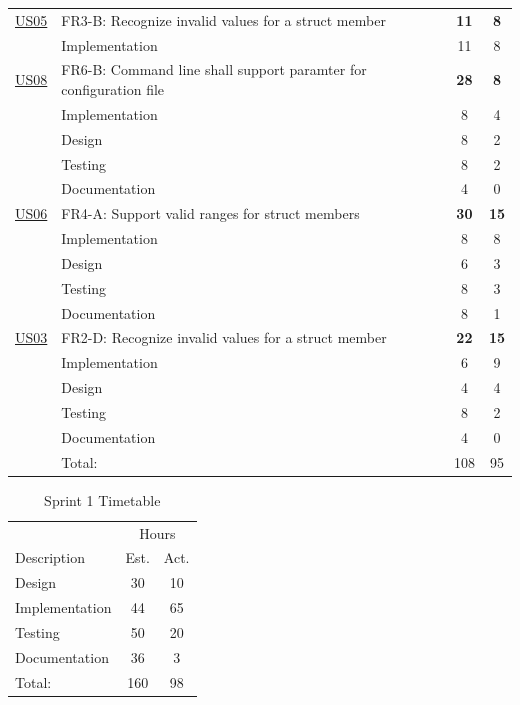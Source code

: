 \begin{table}[!htb]
\begin{tabularx}{\textwidth}{l X c c}
	\addlinespace
	\hyperref[tab:req:stories1]{US05} & FR3-B: Recognize invalid values for a \gls{struct} \gls{member} & \textbf{11} & \textbf{8} \\
	& Implementation & 11 & 8 \\
	\addlinespace
	\hyperref[tab:req:stories2]{US08} & FR6-B: Command line shall support paramter for configuration file & \textbf{28} & \textbf{8} \\
	& Implementation & 8 & 4 \\
	& Design & 8 & 2 \\
	& Testing & 8 & 2 \\
	& Documentation & 4 & 0 \\
	\addlinespace
	\hyperref[tab:req:stories2]{US06} & FR4-A: Support valid ranges for \gls{struct} \glspl{member} & \textbf{30} & \textbf{15} \\
	& Implementation & 8 & 8 \\
	& Design & 6 & 3 \\
	& Testing & 8 & 3 \\
	& Documentation & 8 & 1 \\
	\addlinespace
	\hyperref[tab:req:stories1]{US03} & FR2-D: Recognize invalid values for a \gls{struct} \gls{member} & \textbf{22} & \textbf{15} \\
	& Implementation & 6 & 9 \\
	& Design & 4 & 4 \\
	& Testing & 8 & 2 \\
	& Documentation  & 4 & 0 \\
	\midrule
	& Total: & 108 & 95 \\
	\bottomrule
\end{tabularx}
\end{table}

\begin{table}[!ht] \footnotesize \center
\caption{Sprint 1 Timetable\label{tab:sprint1time}}
\begin{tabularx}{\textwidth}{X c c}
	\toprule
	& \multicolumn{2}{c}{Hours} \\
	\cmidrule(r){2-3}
	Description & Est. & Act. \\
	\midrule
	Design & 30 & 10\\
	\addlinespace
	Implementation & 44 & 65 \\
	\addlinespace
	Testing & 50 & 20\\
	\addlinespace
	Documentation & 36 & 3\\
	\midrule
	Total: & 160 & 98 \\
	\bottomrule
\end{tabularx}
\end{table}



